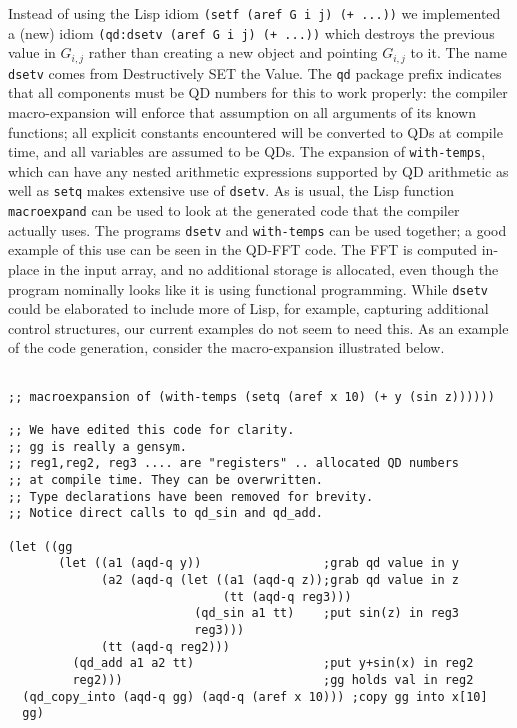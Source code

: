 \documentclass{article}
\begin{document}
Instead of using the Lisp idiom {\tt (setf (aref G i j) (+ ...))}  we
implemented a
(new) idiom {\tt (qd:dsetv (aref G i j) (+ ...))}  which
destroys the previous value in $G_{i,j}$ rather than creating a new
object and pointing $G_{i,j}$ to it. The name {\tt dsetv} comes from
Destructively SET the Value. The {\tt qd} package prefix indicates
that all components must be QD numbers for this to work properly: the
compiler macro-expansion will enforce that assumption on all arguments
of its known functions; all explicit constants encountered will be
converted to QDs at compile time, and all variables are assumed to be
QDs.  The expansion of {\tt with-temps}, which can have any nested
arithmetic expressions supported by QD arithmetic as well as
{\tt setq}  makes extensive use of {\tt dsetv}.  
As is usual, the Lisp function {\tt macroexpand} can
be used to look at the generated code that the compiler
actually uses. The programs {\tt dsetv} and {\tt with-temps}
can be used together; a good example of this use can be seen in the QD-FFT
code. The FFT is computed in-place in the input array, and no
additional storage is allocated, even though the program nominally
looks like it is using functional programming.   While {\tt dsetv} could
be elaborated to include more of Lisp, for example, capturing additional
control structures, our current examples do not seem to need this.
As an example of the code generation, consider the
macro-expansion illustrated below.
\begin{verbatim}

;; macroexpansion of (with-temps (setq (aref x 10) (+ y (sin z))))))

;; We have edited this code for clarity.
;; gg is really a gensym.
;; reg1,reg2, reg3 .... are "registers" .. allocated QD numbers
;; at compile time. They can be overwritten.
;; Type declarations have been removed for brevity.
;; Notice direct calls to qd_sin and qd_add.

(let ((gg
       (let ((a1 (aqd-q y))                 ;grab qd value in y
             (a2 (aqd-q (let ((a1 (aqd-q z));grab qd value in z 
                              (tt (aqd-q reg3)))
                          (qd_sin a1 tt)    ;put sin(z) in reg3
                          reg3)))
             (tt (aqd-q reg2)))             
         (qd_add a1 a2 tt)                  ;put y+sin(x) in reg2
         reg2)))                            ;gg holds val in reg2
  (qd_copy_into (aqd-q gg) (aqd-q (aref x 10))) ;copy gg into x[10]
  gg)
\end{verbatim}
\end{document}
